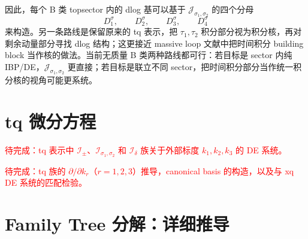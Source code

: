 ﻿\documentclass[a4paper,11pt]{article}
\begin{document}
因此，每个 B 类 topsector 内的 dlog 基可以基于 $\mathcal{J}_{\sigma_1,\sigma_2}$ 的四个分母
\begin{equation}
    D_1^{\sigma},\qquad D_2^{\sigma},\qquad D_3^{\sigma},\qquad D_4^{\sigma}
\end{equation}
来构造。另一条路线是保留原来的 tq 表示，把 $\tau_1,\tau_2$ 积分部分视为积分核，再对剩余动量部分寻找 dlog 结构；这更接近 massive loop 文献中把时间积分 building block 当作核的做法。当前无质量 B 类两种路线都可行：若目标是 sector 内纯 IBP/DE，$\mathcal{J}_{\sigma_1,\sigma_2}$ 更直接；若目标是联立不同 sector，把时间积分部分当作统一积分核的视角可能更系统。

\newpage
\section{tq 微分方程}

\textcolor{red}{待完成：tq 表示中 $\mathcal{I}_{\pm}$、$\mathcal{I}_{\sigma_1,\sigma_2}$ 和 $\mathcal{I}_{\delta}$ 族关于外部标度 $k_1,k_2,k_3$ 的 DE 系统。}

\textcolor{red}{待完成：tq 族的 $\partial/\partial k_r$（$r=1,2,3$）推导，canonical basis 的构造，以及与 xq DE 系统的匹配检验。}

\newpage
\appendix

\section{Family Tree 分解：详细推导}
\end{document}
